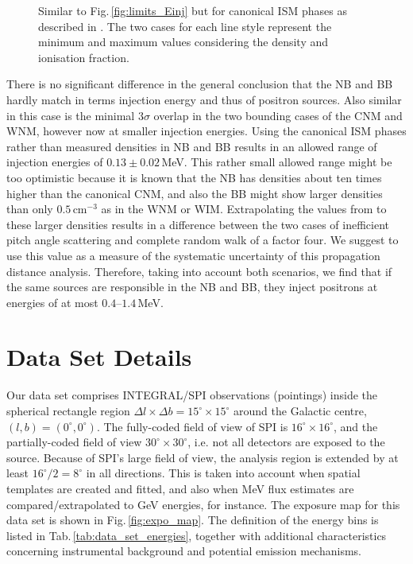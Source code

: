 \documentclass[doublespace,draft,nopageskip]{VTthesis} %
\newcommand{\mrm}[1]{\mathrm{#1}}
\begin{document}
\begin{appendices}
\begin{figure}
		\caption{Similar to Fig.\,\ref{fig:limits_Einj} but for canonical ISM phases as described in \citet{Jean2009_511ISM}. The two cases for each line style represent the minimum and maximum values considering the density and ionisation fraction.}%
		\label{fig:ISM_Einj_results_appendix}%
	\end{figure}
	There is no significant difference in the general conclusion that the NB and BB hardly match in terms injection energy and thus of positron sources.
	Also similar in this case is the minimal $3\sigma$ overlap in the two bounding cases of the CNM and WNM, however now at smaller injection energies.
	Using the canonical ISM phases rather than measured densities in NB and BB results in an allowed range of injection energies of $0.13 \pm 0.02$\,MeV.
	This rather small allowed range might be too optimistic because it is known that the NB has densities about ten times higher than the canonical CNM, and also the BB might show larger densities than only $0.5\,\mrm{cm^{-3}}$ as in the WNM or WIM.
	Extrapolating the values from \citet{Jean2009_511ISM} to these larger densities results in a difference between the two cases of inefficient pitch angle scattering and complete random walk of a factor four.
	We suggest to use this value as a measure of the systematic uncertainty of this propagation distance analysis.
	Therefore, taking into account both scenarios, we find that if the same sources are responsible in the NB and BB, they inject positrons at energies of at most $0.4$--$1.4$\,MeV.
	
	
	
	
	\section{Data Set Details}\label{sec:data_set_details}
	
	Our data set comprises INTEGRAL/SPI observations (pointings) inside the spherical rectangle region $\Delta l \times \Delta b = 15^{\circ} \times 15^{\circ}$ around the Galactic centre, $(l,b) = (0^{\circ},0^{\circ})$.
	The fully-coded field of view of SPI is $16^{\circ}\times16^{\circ}$, and the partially-coded field of view $30^{\circ}\times30^{\circ}$, i.e. not all detectors are exposed to the source.
	Because of SPI's large field of view, the analysis region is extended by at least $16^{\circ}/2 = 8^{\circ}$ in all directions.
	This is taken into account when spatial templates are created and fitted, and also when MeV flux estimates are compared/extrapolated to GeV energies, for instance.
	The exposure map for this data set is shown in Fig.\,\ref{fig:expo_map}.
	The definition of the energy bins is listed in Tab.\,\ref{tab:data_set_energies}, together with additional characteristics concerning instrumental background and potential emission mechanisms.
	

\end{appendices}
\end{document}
